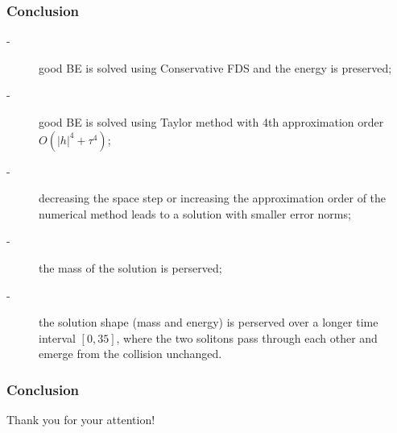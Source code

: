 \documentclass{beamer}
\begin{document}

\begin{frame}
\frametitle{Conclusion}

\begin{description}
 \item[-] good BE is solved using Conservative FDS and the energy is preserved;
 \item[-] good BE is solved using Taylor method with 4th approximation order $O(|h|^4+\tau^4)$;
 \item[-] decreasing the space step or increasing the approximation order of the numerical method leads to a solution with smaller error norms;
 \item[-] the mass of the solution is perserved;
\item[-] the solution shape (mass and energy) is perserved over a longer time interval $[0, 35]$, where the two solitons pass through each other and emerge from the collision unchanged.
\end{description}

\end{frame}



\begin{frame}
\frametitle{Conclusion}

Thank you for your attention!

\end{frame}
\end{document}
